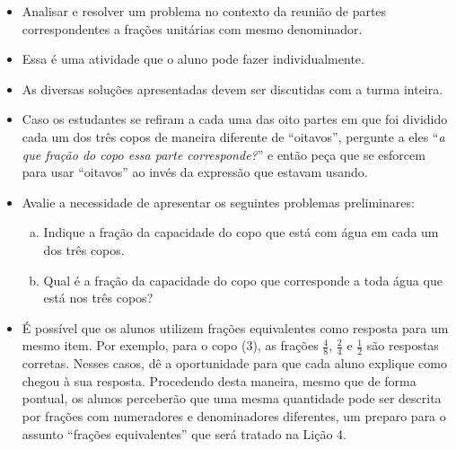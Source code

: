 \begin{multicols}{2}
\begin{objetivos}[label=chap2-ativ10]{}{}
\begin{itemize} %
    \item       Analisar e resolver um problema no contexto da reunião de partes correspondentes a frações unitárias com mesmo denominador.
\end{itemize} %
\end{objetivos}

\begin{orientacoes}
    \begin{itemize} %
    \item Essa é uma atividade que o aluno pode fazer individualmente.
    \item As diversas soluções apresentadas devem ser discutidas com a turma inteira.
    \item Caso os estudantes se refiram a cada uma das oito partes em que foi dividido cada um dos três copos de maneira diferente de ``oitavos'', pergunte a eles ``\textit{a que fração do copo essa parte corresponde?}'' e então peça que se esforcem para usar ``oitavos'' ao invés da expressão que estavam usando.
    \item Avalie a necessidade de apresentar os seguintes problemas preliminares:
      \begin{enumerate}[a)]
      \item Indique a fração da capacidade do copo que está com água em cada um dos três copos.
      \item Qual é a fração da capacidade do copo que corresponde a toda água que está nos três copos?
      \end{enumerate}
    \item É possível que os alunos utilizem frações equivalentes como resposta para um mesmo item. Por exemplo, para o copo (3), as frações $\frac{4}{8}$, $\frac{2}{4}$ e $\frac{1}{2}$ são respostas corretas. Nesses casos, dê a oportunidade para que cada aluno explique como chegou à sua resposta. Procedendo desta maneira, mesmo que de forma pontual, os alunos perceberão que uma mesma quantidade pode ser descrita por frações com numeradores e denominadores diferentes, um preparo para o assunto ``frações equivalentes'' que será tratado na Lição 4.
\end{itemize} %


\end{orientacoes}
\end{multicols}
